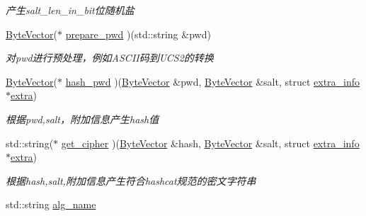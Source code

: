 \begin{DoxyCompactItemize}
\begin{DoxyCompactList}\small\item\em 产生salt\+\_\+len\+\_\+in\+\_\+bit位随机盐 \end{DoxyCompactList}\item 
\mbox{\label{structalg__desp_a65f622300536302d87cf998484f63358}} 
\mbox{\hyperlink{class_byte_vector}{Byte\+Vector}}($\ast$ \mbox{\hyperlink{structalg__desp_a65f622300536302d87cf998484f63358}{prepare\+\_\+pwd}} )(std\+::string \&pwd)
\begin{DoxyCompactList}\small\item\em 对pwd进行预处理，例如\+A\+S\+C\+I\+I码到\+U\+C\+S2的转换 \end{DoxyCompactList}\item 
\mbox{\label{structalg__desp_ac44d43fa2f1cdaf637239832b9840634}} 
\mbox{\hyperlink{class_byte_vector}{Byte\+Vector}}($\ast$ \mbox{\hyperlink{structalg__desp_ac44d43fa2f1cdaf637239832b9840634}{hash\+\_\+pwd}} )(\mbox{\hyperlink{class_byte_vector}{Byte\+Vector}} \&pwd, \mbox{\hyperlink{class_byte_vector}{Byte\+Vector}} \&salt, struct \mbox{\hyperlink{structextra__info}{extra\+\_\+info}} $\ast$\mbox{\hyperlink{structalg__desp_a02eb817495fc1d08be8f4dbe1769f9e5}{extra}})
\begin{DoxyCompactList}\small\item\em 根据pwd,salt，附加信息产生hash值 \end{DoxyCompactList}\item 
\mbox{\label{structalg__desp_a69f7eae5b6d9e09953587b2c6764eb0b}} 
std\+::string($\ast$ \mbox{\hyperlink{structalg__desp_a69f7eae5b6d9e09953587b2c6764eb0b}{get\+\_\+cipher}} )(\mbox{\hyperlink{class_byte_vector}{Byte\+Vector}} \&hash, \mbox{\hyperlink{class_byte_vector}{Byte\+Vector}} \&salt, struct \mbox{\hyperlink{structextra__info}{extra\+\_\+info}} $\ast$\mbox{\hyperlink{structalg__desp_a02eb817495fc1d08be8f4dbe1769f9e5}{extra}})
\begin{DoxyCompactList}\small\item\em 根据hash,salt,附加信息产生符合hashcat规范的密文字符串 \end{DoxyCompactList}\item 
\mbox{\label{structalg__desp_a6a61b0312ffd47b7c045915ce5aecdc7}} 
std\+::string \mbox{\hyperlink{structalg__desp_a6a61b0312ffd47b7c045915ce5aecdc7}{alg\+\_\+name}}

\end{DoxyCompactItemize}
